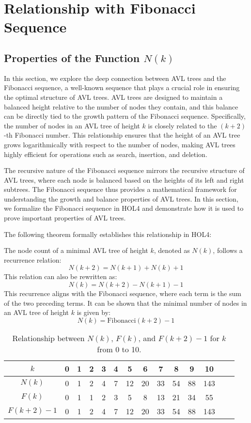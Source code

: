 \chapter{Relationship with Fibonacci Sequence}\label{chap:content}

\section{Properties of the Function \texorpdfstring{$N(k)$}{N(k)}}

In this section, we explore the deep connection between AVL trees and the Fibonacci sequence, a well-known sequence that plays a crucial role in ensuring the optimal structure of AVL trees. AVL trees are designed to maintain a balanced height relative to the number of nodes they contain, and this balance can be directly tied to the growth pattern of the Fibonacci sequence. Specifically, the number of nodes in an AVL tree of height \( k \) is closely related to the \( (k+2) \)-th Fibonacci number. This relationship ensures that the height of an AVL tree grows logarithmically with respect to the number of nodes, making AVL trees highly efficient for operations such as search, insertion, and deletion.

The recursive nature of the Fibonacci sequence mirrors the recursive structure of AVL trees, where each node is balanced based on the heights of its left and right subtrees. The Fibonacci sequence thus provides a mathematical framework for understanding the growth and balance properties of AVL trees. In this section, we formalize the Fibonacci sequence in HOL4 and demonstrate how it is used to prove important properties of AVL trees.

The following theorem formally establishes this relationship in HOL4:

	The node count of a minimal AVL tree of height $k$, denoted as $N(k)$, follows a recurrence relation:
	\[
	N(k+2) = N(k+1) + N(k) + 1
	\]
	This relation can also be rewritten as:
	\[
	N(k) = N(k+2) - N(k+1) - 1
	\]
	This recurrence aligns with the Fibonacci sequence, where each term is the sum of the two preceding terms. It can be shown that the minimal number of nodes in an AVL tree of height $k$ is given by:
	\[
	N(k) = \text{Fibonacci}(k+2) - 1
	\]


\begin{table}
	\centering
	\begin{tabular}{cccccccccccccc}
		\toprule
		\textbf{$k$}          & 0   & 1   & 2   & 3   & 4   & 5    & 6    & 7    & 8    & 9    & 10     \\ \midrule
		\textbf{$N(k)$}       & 0   & 1   & 2   & 4   & 7   & 12   & 20   & 33   & 54   & 88   & 143   \\ \midrule
		\textbf{$F(k)$}       & 0   & 1   & 1   & 2   & 3   & 5    & 8    & 13   & 21   & 34   & 55    \\ \midrule
		\textbf{$F(k+2) - 1$} & 0   & 1   & 2   & 4   & 7   & 12   & 20   & 33   & 54   & 88   & 143  \\ 
		\bottomrule
	\end{tabular}
	\caption{Relationship between $N(k)$, $F(k)$, and $F(k+2) - 1$ for $k$ from 0 to 10.}
\end{table}

